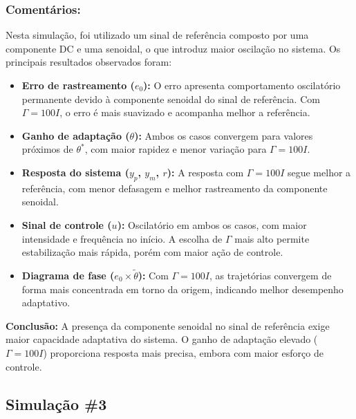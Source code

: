 \documentclass[10pt]{article}
\begin{document}
\subsubsection{Comentários:}

Nesta simulação, foi utilizado um sinal de referência composto por uma componente DC e uma senoidal, o que introduz maior oscilação no sistema. Os principais resultados observados foram:

\begin{itemize}
    \item \textbf{Erro de rastreamento ($e_0$):} O erro apresenta comportamento oscilatório permanente devido à componente senoidal do sinal de referência. Com $\Gamma = 100I$, o erro é mais suavizado e acompanha melhor a referência.

    \item \textbf{Ganho de adaptação ($\theta$):} Ambos os casos convergem para valores próximos de $\theta^*$, com maior rapidez e menor variação para $\Gamma = 100I$.

    \item \textbf{Resposta do sistema ($y_p$, $y_m$, $r$):} A resposta com $\Gamma = 100I$ segue melhor a referência, com menor defasagem e melhor rastreamento da componente senoidal.

    \item \textbf{Sinal de controle ($u$):} Oscilatório em ambos os casos, com maior intensidade e frequência no início. A escolha de $\Gamma$ mais alto permite estabilização mais rápida, porém com maior ação de controle.

    \item \textbf{Diagrama de fase ($e_0 \times \tilde{\theta}$):} Com $\Gamma = 100I$, as trajetórias convergem de forma mais concentrada em torno da origem, indicando melhor desempenho adaptativo.

\end{itemize}

\textbf{Conclusão:} A presença da componente senoidal no sinal de referência exige maior capacidade adaptativa do sistema. O ganho de adaptação elevado ($\Gamma = 100I$) proporciona resposta mais precisa, embora com maior esforço de controle.

\newpage

\subsection{Simulação \#3}
\end{document}
